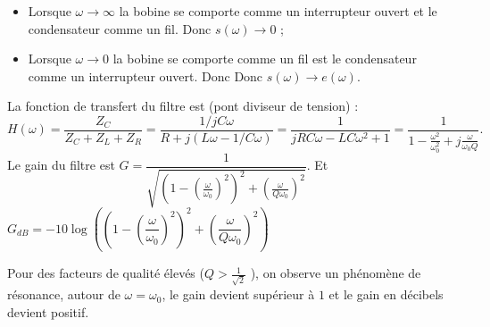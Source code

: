 \documentclass{cours}
\begin{document}
\begin{itemize}
\item Lorsque $\omega \rightarrow \infty$ la bobine se comporte comme un interrupteur ouvert et le condensateur comme un fil. Donc $s(\omega)\rightarrow 0$ ; 
\item Lorsque $\omega \rightarrow 0$ la bobine se comporte comme un fil est le condensateur comme un interrupteur ouvert. Donc Donc $s(\omega)\rightarrow e(\omega)$.
\end{itemize}
La fonction de transfert du filtre est (pont diviseur de tension) : 
\begin{equation*}
H(\omega) = \frac{Z_C}{Z_C+Z_L+Z_R} = \frac{1/jC\omega}{R+j(L\omega-1/C\omega)} = \frac{1}{jRC\omega-LC\omega^2+1} = \frac{1}{1-\frac{\omega^2}{\omega_0^2}+j \frac{\omega}{\omega_0Q}}.
\end{equation*}
Le gain du filtre est $G = \dfrac{1}{\sqrt{\left( 1- \left( \frac{\omega}{\omega_0} \right)^2 \right)^2+\left( \frac{\omega}{Q\omega_0} \right)^2}}$. Et $G_{dB}=-10\log\left(\left( 1- \left( \dfrac{\omega}{\omega_0} \right)^2 \right)^2+\left( \dfrac{\omega}{Q\omega_0} \right)^2\right)$

\begin{center}
\end{center}

Pour des facteurs de qualité élevés ($Q>\frac{1}{\sqrt{2}}$ ), on observe un phénomène de résonance, autour de $\omega=\omega_0$, le gain devient supérieur à $1$  et le gain en décibels devient positif.
\end{document}
